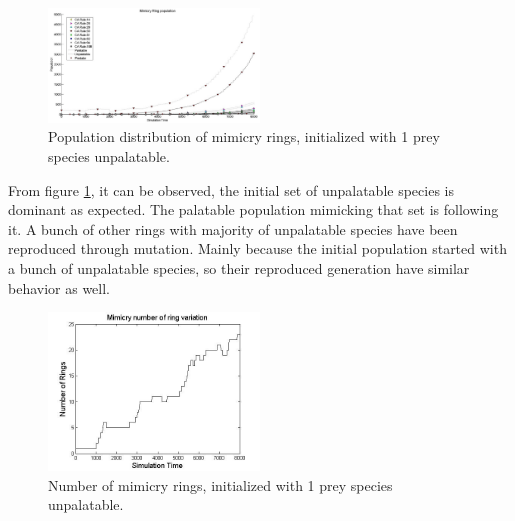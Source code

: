 \documentclass[letterpaper]{article}
\numberwithin{equation}{section}
\begin{document}
\begin{figure}[H]
	\centering
	\includegraphics[width=0.5\textwidth]{../tex/images/simTime8k-1Prey-unp}
	\caption[Population distribution of mimicry rings (1 prey species unpalatable)]{Population distribution of mimicry rings, initialized with 1 prey species unpalatable.}
	\label{fig:plot-1-prey-unp}
\end{figure}

From figure \ref{fig:plot-1-prey-unp}, it can be observed, the initial set of unpalatable species is dominant as expected. The palatable population mimicking that set is following it. A bunch of other rings with majority of unpalatable species have been reproduced through mutation. Mainly because the initial population started with a bunch of unpalatable species, so their reproduced generation have similar behavior as well.

\begin{figure}[H]
	\centering
	\includegraphics[width=0.5\textwidth]{../tex/images/ringSize8k-1Prey-unp}
	\caption[Number of mimicry rings (1 prey species unpalatable)]{Number of mimicry rings, initialized with 1 prey species unpalatable.}
	\label{fig:ringSize8k-1-Prey-unp}
\end{figure}
\end{document}
